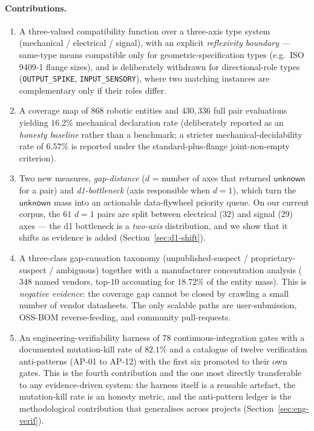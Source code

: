 \documentclass[review]{elsarticle}
\begin{document}
\paragraph{Contributions.}
\begin{enumerate}[nosep]
\item A three-valued compatibility function over a three-axis type
system (mechanical / electrical / signal), with an explicit
\emph{reflexivity boundary} — same-type means compatible only for
geometric-specification types (e.g.\ ISO 9409-1 flange sizes), and is
deliberately withdrawn for directional-role types
(\texttt{OUTPUT\_SPIKE}, \texttt{INPUT\_SENSORY}), where two matching
instances are complementary only if their roles differ.

\item A coverage map of $868$ robotic entities and $430{,}336$ full
pair evaluations yielding $16.2\%$ mechanical declaration rate
(deliberately reported as an \emph{honesty baseline} rather than
a benchmark; a stricter mechanical-decidability rate of $6.57\%$ is
reported under the standard-plus-flange joint-non-empty criterion).

\item Two new measures, \emph{gap-distance} ($d$ = number of axes
that returned $\mathsf{unknown}$ for a pair) and \emph{d1-bottleneck}
(axis responsible when $d=1$), which turn the $\mathsf{unknown}$ mass
into an actionable data-flywheel priority queue. On our current
corpus, the $61$ $d=1$ pairs are split between electrical ($32$)
and signal ($29$) axes --- the d1 bottleneck is a
\emph{two-axis} distribution, and we show that it shifts as evidence
is added (Section~\ref{sec:d1-shift}).

\item A three-class gap-causation taxonomy
(unpublished-suspect / proprietary-suspect / ambiguous) together with
a manufacturer concentration analysis ($348$ named vendors,
top-$10$ accounting for $18.72\%$ of the entity mass). This is
\emph{negative evidence}: the coverage gap cannot be closed by
crawling a small number of vendor datasheets. The only scalable paths
are user-submission, OSS-BOM reverse-feeding, and community pull-requests.

\item An engineering-verifiability harness of $78$ continuous-integration
gates with a documented mutation-kill rate of $82.1\%$ and a catalogue
of twelve verification anti-patterns (AP-01 to AP-12) with the first
six promoted to their own gates. This is the fourth contribution and
the one most directly transferable to any evidence-driven system: the
harness itself is a reusable artefact, the mutation-kill rate is an
honesty metric, and the anti-pattern ledger is the methodological
contribution that generalises across projects (Section~\ref{sec:eng-verif}).
\end{enumerate}
\end{document}

